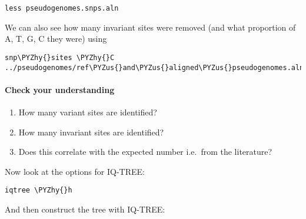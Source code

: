\documentclass[11pt]{article}
\makeatletter
\providecommand{\tightlist}{%
      \setlength{\itemsep}{0pt}\setlength{\parskip}{0pt}}
\def\PYZus{\char`\_}
\def\PYZhy{\char`\-}
\newcommand{\boxspacing}{\kern\kvtcb@left@rule\kern\kvtcb@boxsep}
\newcommand{\prompt}[4]{
        {
        \ttfamily\llap{{\color{blue}\LARGE\faKeyboardO\hspace{3pt}#4}}\vspace{-\baselineskip}
	}
    }
\makeatother
\begin{document}
    \begin{tcolorbox}[breakable, size=fbox, boxrule=1pt, pad at break*=1mm,colback=cellbackground, colframe=cellborder]
\prompt{In}{incolor}{ }{\boxspacing}
\begin{Verbatim}[commandchars=\\\{\}]
less pseudogenomes.snps.aln
\end{Verbatim}
\end{tcolorbox}

    We can also see how many invariant sites were removed (and what
proportion of A, T, G, C they were) using

    \begin{tcolorbox}[breakable, size=fbox, boxrule=1pt, pad at break*=1mm,colback=cellbackground, colframe=cellborder]
\prompt{In}{incolor}{ }{\boxspacing}
\begin{Verbatim}[commandchars=\\\{\}]
snp\PYZhy{}sites \PYZhy{}C ../pseudogenomes/ref\PYZus{}and\PYZus{}aligned\PYZus{}pseudogenomes.aln
\end{Verbatim}
\end{tcolorbox}

    \hypertarget{check-your-understanding}{%
\paragraph{Check your understanding}\label{check-your-understanding}}

\begin{enumerate}
\def\labelenumi{\arabic{enumi}.}
\tightlist
\item
  How many variant sites are identified?
\item
  How many invariant sites are identified?
\item
  Does this correlate with the expected number i.e.~from the literature?
\end{enumerate}

Now look at the options for IQ-TREE:

    \begin{tcolorbox}[breakable, size=fbox, boxrule=1pt, pad at break*=1mm,colback=cellbackground, colframe=cellborder]
\prompt{In}{incolor}{ }{\boxspacing}
\begin{Verbatim}[commandchars=\\\{\}]
iqtree \PYZhy{}h
\end{Verbatim}
\end{tcolorbox}

    And then construct the tree with IQ-TREE:
\end{document}
